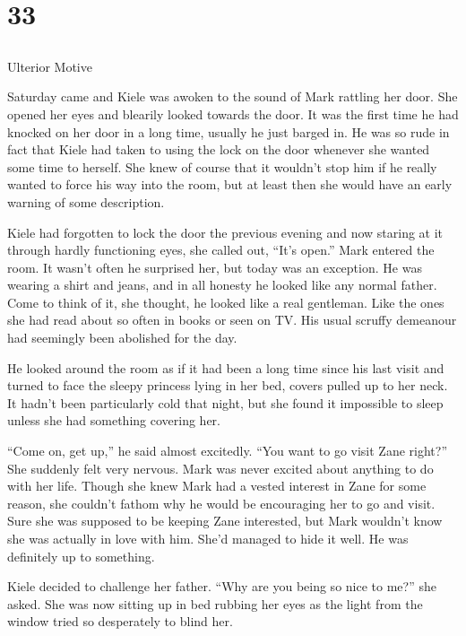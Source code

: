 \chapter{33}
\section{}
Ulterior Motive  

Saturday came and Kiele was awoken to the sound of Mark rattling her door.  She opened her eyes and blearily looked towards the door.  It was the first time he had knocked on her door in a long time, usually he just barged in.  He was so rude in fact that Kiele had taken to using the lock on the door whenever she wanted some time to herself.  She knew of course that it wouldn't stop him if he really wanted to force his way into the room, but at least then she would have an early warning of some description.

Kiele had forgotten to lock the door the previous evening and now staring at it through hardly functioning eyes, she called out, ``It's open.''  Mark entered the room.  It wasn't often he surprised her, but today was an exception.  He was wearing a shirt and jeans, and in all honesty he looked like any normal father.  Come to think of it, she thought, he looked like a real gentleman.  Like the ones she had read about so often in books or seen on TV.  His usual scruffy demeanour had seemingly been abolished for the day.   

He looked around the room as if it had been a long time since his last visit and turned to face the sleepy princess lying in her bed, covers pulled up to her neck.  It hadn't been particularly cold that night, but she found it impossible to sleep unless she had something covering her.  

``Come on, get up,'' he said almost excitedly.  ``You want to go visit Zane right?''  She suddenly felt very nervous.  Mark was never excited about anything to do with her life.  Though she knew Mark had a vested interest in Zane for some reason, she couldn't fathom why he would be encouraging her to go and visit.  Sure she was supposed to be keeping Zane interested, but Mark wouldn't know she was actually in love with him.  She'd managed to hide it well.  He was definitely up to something.  

Kiele decided to challenge her father.  ``Why are you being so nice to me?'' she asked.  She was now sitting up in bed rubbing her eyes as the light from the window tried so desperately to blind her.


